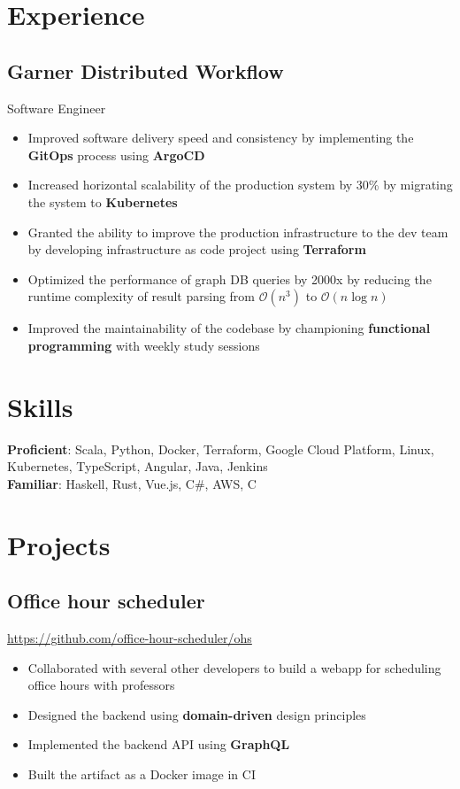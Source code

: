 \documentclass[letterpaper,12pt,oneside]{article}
\newcommand{\smallurl}[1]{\footnotesize{\url{#1}}\normalsize}
\begin{document}
\section*{Experience}
\subsection*{Garner Distributed Workflow \hfill {}}
Software Engineer
\begin{itemize}
    \setlength\itemsep{0em}
    \item Improved software delivery speed and consistency by implementing the \textbf{GitOps} process using \textbf{ArgoCD}
    \item Increased horizontal scalability of the production system by 30\% by migrating the system to \textbf{Kubernetes}
    \item Granted the ability to improve the production infrastructure to the dev team by developing infrastructure as code project using \textbf{Terraform}
    \item Optimized the performance of graph DB queries by 2000x by reducing the runtime complexity of result parsing from $\mathcal{O}(n^3)$ to $\mathcal{O}(n\log{}n)$
    \item Improved the maintainability of the codebase by championing \textbf{functional programming} with weekly study sessions
\end{itemize}

\section*{Skills}
\textbf{Proficient}:
Scala, Python, Docker, Terraform, Google Cloud Platform, Linux,
Kubernetes, TypeScript, Angular, Java, Jenkins \\
\textbf{Familiar}:
Haskell, Rust, Vue.js, C\#, AWS, C

\section*{Projects}

\subsection*{Office hour scheduler \hfill {}}
\smallurl{https://github.com/office-hour-scheduler/ohs}
\begin{itemize}
    \setlength\itemsep{0em}
    \item Collaborated with several other developers to build a webapp for scheduling office hours with professors
    \item Designed the backend using \textbf{domain-driven} design principles
    \item Implemented the backend API using \textbf{GraphQL}
    \item Built the artifact as a Docker image in CI
\end{itemize}
\end{document}

